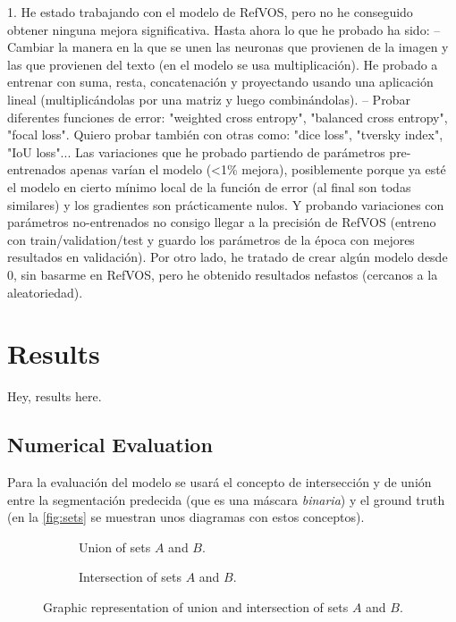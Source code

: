 1. He estado trabajando con el modelo de RefVOS, pero no he conseguido obtener
ninguna mejora significativa. Hasta ahora lo que he probado ha sido: -- Cambiar
la manera en la que se unen las neuronas que provienen de la imagen y las que
provienen del texto (en el modelo se usa multiplicación). He probado a entrenar
con suma, resta, concatenación y proyectando usando una aplicación lineal
(multiplicándolas por una matriz y luego combinándolas).  -- Probar diferentes
funciones de error: "weighted cross entropy", "balanced cross entropy", "focal
loss". Quiero probar también con otras como: "dice loss", "tversky index", "IoU
loss"...  Las variaciones que he probado partiendo de parámetros pre-entrenados
apenas varían el modelo (<1\% mejora), posiblemente porque ya esté el modelo en
cierto mínimo local de la función de error (al final son todas similares) y los
gradientes son prácticamente nulos.  Y probando variaciones con parámetros
no-entrenados no consigo llegar a la precisión de RefVOS (entreno con
train/validation/test y guardo los parámetros de la época con mejores
resultados en validación).  Por otro lado, he tratado de crear algún modelo
desde 0, sin basarme en RefVOS, pero he obtenido resultados nefastos (cercanos
a la aleatoriedad).


\section{Results}
Hey, results here.

\subsection{Numerical Evaluation} \label{sec:evaluation}

Para la evaluación del modelo se usará el concepto de intersección y de unión
entre la segmentación predecida (que es una máscara \emph{binaria}) y el ground
truth (en la \vref{fig:sets} se muestran unos diagramas con estos
conceptos).

\begin{figure}[ht]
  \begin{subfigure}[t]{.5\textwidth}
    \centering
    \caption{Union of sets \(A\) and \(B\).}
    
  \end{subfigure}
  \begin{subfigure}[t]{.5\textwidth}
    \centering
    \caption{Intersection of sets \(A\) and \(B\).}
    
  \end{subfigure}
  \caption[Union and intersection of sets \(A\) and \(B\)]{Graphic
    representation of union and intersection of sets \(A\) and \(B\).}
  \label{fig:sets}
\end{figure}

